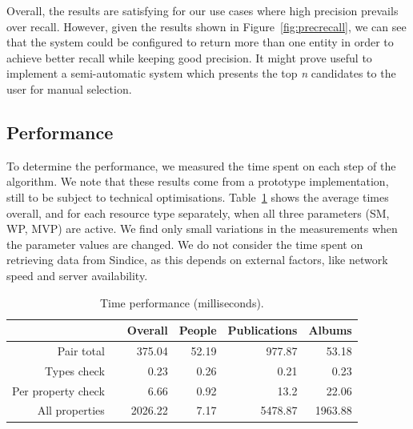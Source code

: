 Overall, the results are satisfying for our use cases where high precision prevails over recall. However, given the results shown in Figure~\ref{fig:precrecall}, we can see that the system could be configured to return more than one entity in order to achieve better recall while keeping good precision. It might prove useful to implement a semi-automatic system which presents the top \emph{n} candidates to the user for manual selection.

\subsection{Performance}

To determine the performance, we measured the time spent on each step of the algorithm. We note that these results come from a prototype implementation, still to be subject to technical optimisations. Table~\ref{tab:sdwodtimes} shows the average times overall, and for each resource type separately, when all three parameters (SM, WP, MVP) are active. We find only small variations in the measurements when the parameter values are changed. We do not consider the time spent on retrieving data from Sindice, as this depends on external factors, like network speed and server availability. 

\begin{table}[htb]
\centering
{}
\begin{tabular}{@{}rcr@{\hs}r@{\hs}r@{\hs}r@{}}
\toprule
& \phantom{a} & Overall & People & Publications & Albums \\ 
\midrule

 Pair total && 375.04 & 52.19 & 977.87 & 53.18 \\

 Types check && 0.23 & 0.26 & 0.21 & 0.23 \\

 Per property check && 6.66 & 0.92 & 13.2 & 22.06 \\

 All properties && 2026.22 & 7.17 & 5478.87 & 1963.88 \\

\bottomrule
\end{tabular}
\caption{Time performance (milliseconds).}
\label{tab:sdwodtimes}
\end{table}

